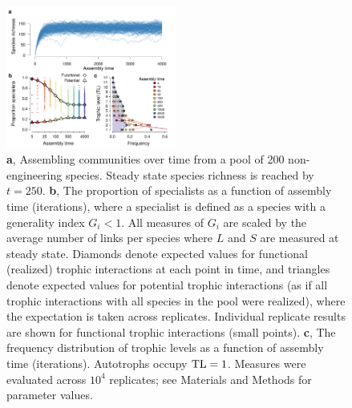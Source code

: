 \documentclass[twocolumn,preprintnumbers,amsmath,amssymb,superscriptaddress,linenumbers]{revtex4-1}
\begin{document}
\vspace{0mm}
\begin{figure}[h!]
\centering
\includegraphics[width=0.5\textwidth]{fig_trophic3.pdf}
\vspace{0mm}
\caption{
\textbf{a}, Assembling communities over time from a pool of 200 non-engineering species. 
Steady state species richness is reached by $t=250$.
\textbf{b}, The proportion of specialists as a function of assembly time (iterations), where a specialist is defined as a species with a generality index $G_i < 1$.
All measures of $G_i$ are scaled by the average number of links per species where $L$ and $S$ are measured at steady state.
Diamonds denote expected values for functional (realized) trophic interactions at each point in time, and triangles denote expected values for potential trophic interactions (as if all trophic interactions with all species in the pool were realized), where the expectation is taken across replicates. Individual replicate results are shown for functional trophic interactions (small points).
\textbf{c}, The frequency distribution of trophic levels as a function of assembly time (iterations). 
Autotrophs occupy ${\rm TL}=1$.
Measures were evaluated across $10^4$ replicates; see Materials and Methods for parameter values.
\vspace{0mm}
}
\label{fig:trophic}
\end{figure}
\end{document}
